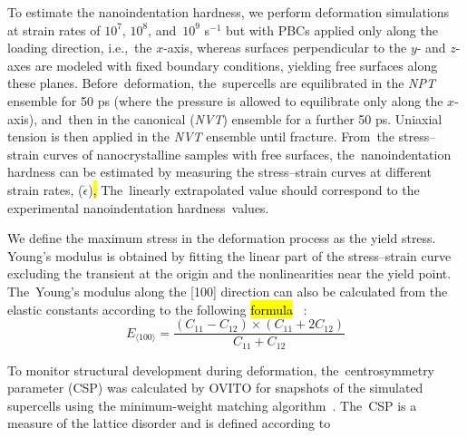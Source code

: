 \documentclass[applsci,article,accept,pdftex,moreauthors]{Definitions/mdpi}
\newcommand{\?}{\stackrel{?}{=}}
\begin{document}
To estimate the nanoindentation hardness, we perform deformation simulations at strain rates of $10^7$, $10^8$, and~$10^9$ s$^{-1}$ but with PBCs applied only along the loading direction, i.e.,~the $x$-axis, whereas surfaces perpendicular to the $y$- and $z$-axes are modeled with fixed boundary conditions, yielding free surfaces along these planes. Before~deformation, the~supercells are equilibrated in the \textit{NPT} ensemble for 50 ps (where the pressure is allowed to equilibrate only along the $x$-axis), and~then in the canonical (\textit{NVT}) ensemble for a further 50 ps. Uniaxial tension is then applied in the \textit{NVT} ensemble until fracture. From~the stress--strain curves of nanocrystalline samples with free surfaces, the~nanoindentation hardness can be estimated by measuring the stress--strain curves at different strain rates, ($\Dot\epsilon$)\hl{,} %
  The~linearly extrapolated value should correspond to the experimental nanoindentation hardness~values.

We define the maximum stress in the deformation process as the yield stress. Young's modulus is obtained by fitting the linear part of the stress--strain curve excluding the transient at the origin and the nonlinearities near the yield point. The~Young's modulus along the [100] direction can also be calculated from the elastic constants according to the following \hl{formula} %
~\cite{Rosler2007}:
\begin{equation}
E_{\langle 100 \rangle} = \frac{(C_{11}-C_{12}) \times (C_{11}+2 C_{12})}{C_{11}+C_{12}}
\label{Eq:E100}
\end{equation}


To monitor structural development during deformation, the~centrosymmetry parameter (CSP) was calculated by OVITO for snapshots of the simulated supercells using the minimum-weight matching algorithm~\cite{Larsen2020}. The~CSP is a measure of the lattice disorder and is defined according to~\cite{Kelchner1998}\hl{} %
\end{document}
